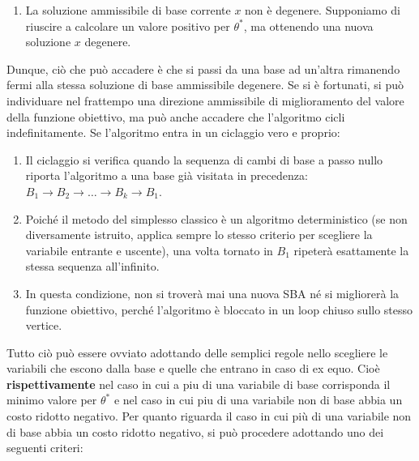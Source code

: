 \begin{enumerate}
\textbf{Prima del pivot}:
\begin{itemize}
    \item La variabile entrante \(x_j=0\), perché è non di base (\(j\in N\)).
    \item La variabile uscente \(x_i=0\), perché è una variabile di base degenere (\(i\in B\)).
\end{itemize}
\textbf{Dopo il pivot:}
\begin{itemize}
    \item La variabile entrante \(x_j=0\), ma ora è di base (\(j\in B'\)).
    \item La variabile uscente \(x_i=0\), ma ora è non di base (\(i\in N'\))
\end{itemize}
\item  La soluzione ammissibile di base corrente $x$ non è degenere. Supponiamo di riuscire a calcolare un valore positivo per $\theta^*$, ma ottenendo una
nuova soluzione $x$ degenere.

\end{enumerate}
Dunque, ciò che può accadere è che si passi da una base ad un'altra rimanendo fermi alla stessa soluzione di base ammissibile degenere. Se si è fortunati, si può individuare nel frattempo una direzione ammissibile di
miglioramento del valore della funzione obiettivo, ma può anche accadere
che l'algoritmo cicli indefinitamente.
Se l'algoritmo entra in un ciclaggio vero e proprio:
\begin{enumerate}
    \item Il ciclaggio si verifica quando la sequenza di cambi di base a passo nullo riporta l'algoritmo a una base già visitata in precedenza: $B_1 \to B_2 \to \dots \to B_k \to B_1$.
    \item Poiché il metodo del simplesso classico è un algoritmo deterministico (se non diversamente istruito, applica sempre lo stesso criterio per scegliere la variabile entrante e uscente), una volta tornato in $B_1$ ripeterà esattamente la stessa sequenza all'infinito.
    \item In questa condizione, non si troverà mai una nuova SBA né si migliorerà la funzione obiettivo, perché l'algoritmo è bloccato in un loop chiuso sullo stesso vertice.
\end{enumerate}

Tutto ciò può essere ovviato adottando delle semplici regole nello scegliere le variabili che escono dalla base
e quelle che entrano in caso di ex equo. Cioè \textbf{rispettivamente} nel caso in cui a piu di una
variabile di base corrisponda il minimo valore per $\theta^*$ e nel caso in cui piu di
una variabile non di base abbia un costo ridotto negativo.
Per quanto riguarda il caso in cui più di una variabile non di base abbia un costo ridotto negativo, si può procedere adottando uno dei seguenti criteri:

